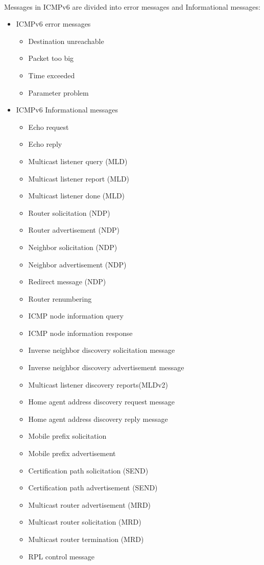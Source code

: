 \documentclass[12pt,a4paper]{report}
\begin{document}
\paragraph{}Messages in ICMPv6 are divided into error messages and Informational messages:
\begin{itemize}
	\item ICMPv6 error messages
	\begin{itemize}
		\item Destination unreachable
		\item Packet too big
		\item Time exceeded
		\item Parameter problem
	\end{itemize}
	\item ICMPv6 Informational messages
	\begin{itemize}
		\item Echo request
		\item Echo reply
		\item Multicast listener query (MLD)
		\item Multicast listener report (MLD)
		\item Multicast listener done (MLD)
		\item Router solicitation (NDP)
		\item Router advertisement (NDP)
		\item Neighbor solicitation (NDP)
		\item Neighbor advertisement (NDP)
		\item Redirect message (NDP)
		\item Router renumbering
		\item ICMP node information query
		\item ICMP node information response
		\item Inverse neighbor discovery solicitation message
		\item Inverse neighbor discovery advertisement message
		\item Multicast listener discovery reports(MLDv2)
		\item Home agent address discovery request message
		\item Home agent address discovery reply message
		\item Mobile prefix solicitation
		\item Mobile prefix advertisement
		\item Certification path solicitation (SEND)
		\item Certification path advertisement (SEND)
		\item Multicast router advertisement (MRD)
		\item Multicast router solicitation (MRD)
		\item Multicast router termination (MRD)
		\item RPL control message
	\end{itemize}
\end{itemize}
\end{document}
